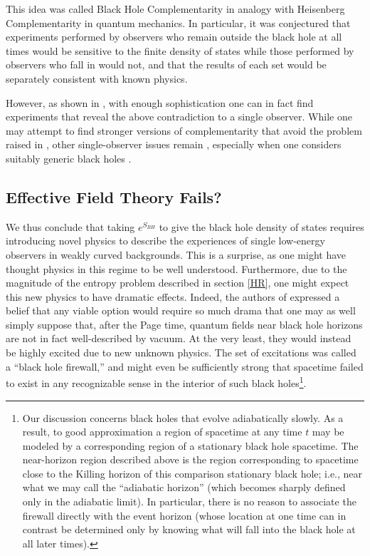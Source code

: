 \documentclass[10pt]{article}
\begin{document}
This idea was called Black Hole Complementarity in analogy with Heisenberg Complementarity in quantum mechanics.  In particular, it was conjectured that experiments performed by observers who remain outside the black hole at all times would be sensitive to the finite density of states while those performed by observers who fall in would not, and that the results of each set would be separately consistent with known physics.

However, as shown in \cite{Almheiri:2012rt}, with enough sophistication one can in fact find experiments that reveal the above contradiction to a single observer.  While  one may attempt to find stronger versions of complementarity  \cite{Bousso:2012as,Harlow:2013tf} that avoid the problem raised in \cite{Almheiri:2012rt}, other single-observer issues remain \cite{Almheiri:2013hfa,Oppenheim:2014gfa}, especially when one considers suitably generic black holes \cite{BoussoTalk,Marolf:2013dba,Bousso:2013wia}.


\subsection{Effective Field Theory Fails?}
\label{EFTF}

We thus conclude that taking $e^{S_{BH}}$ to give the black hole density of states requires introducing novel physics to describe the experiences of single low-energy observers in weakly curved backgrounds.  This is a surprise, as one might have thought physics in this regime to be well understood.  Furthermore, due to the magnitude of the entropy problem described in section \ref{HR}, one might expect this new physics to have dramatic effects.  Indeed, the authors of \cite{Almheiri:2012rt} expressed a belief that any viable option would require so much drama that one may as well simply suppose that, after the Page time, quantum fields near black hole horizons are not in fact well-described by vacuum.  At the very least, they would instead be highly excited due to new unknown physics.  The set of excitations was called a ``black hole firewall,'' and might even be sufficiently strong that spacetime failed to exist in any recognizable sense in the interior of such black holes\footnote{Our discussion concerns black holes that evolve adiabatically slowly.  As a result, to good approximation a region of spacetime at any time $t$ may be modeled by a corresponding region of a stationary black hole spacetime.  The near-horizon region described above is the region corresponding to spacetime close to the Killing horizon of this comparison stationary black hole; i.e., near what we may call the ``adiabatic horizon'' (which becomes sharply defined only in the adiabatic limit).  In particular, there is no reason to associate the firewall directly with the event horizon (whose location at one time can in contrast be determined only by knowing what will fall into the black hole at all later times). }.
\end{document}
